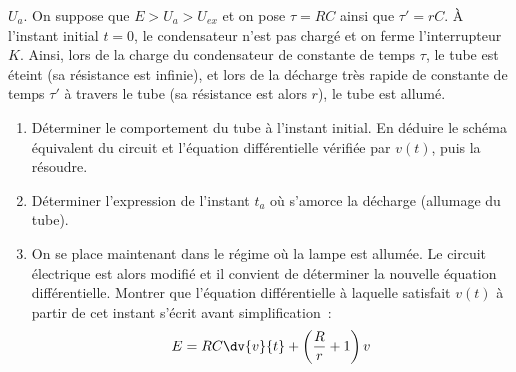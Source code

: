 \documentclass[a4paper, 10pt, garamond, oneside]{book}
\begin{document}
{	$U_{a}$.
	\bigbreak
	On suppose que $E > U_{a}  > U_{ex}$ et on pose $\tau = RC$ ainsi que
	$\tau' = rC$.
	\smallbreak
	À l'instant initial $t = 0$, le condensateur n'est pas chargé et on ferme
	l'interrupteur $K$.
	\bigbreak
	Ainsi, lors de la charge du condensateur de constante de temps $\tau$, le tube
	est éteint (sa résistance est infinie), et lors de la décharge très rapide de
	constante de temps $\tau'$ à travers le tube (sa résistance est alors $r$), le
	tube est allumé.
	\begin{enumerate}
		\item
		      Déterminer le comportement du tube à l'instant initial.
		      En déduire le schéma équivalent du circuit et l'équation différentielle vérifiée par $v(t)$, puis la résoudre.
		\item
		      Déterminer l'expression de l'instant $t_{a}$  où s'amorce la décharge (allumage du tube).
		\item
		      On se place maintenant dans le régime où la lampe est allumée. Le circuit électrique est alors modifié et il convient de déterminer la nouvelle équation différentielle. Montrer que l'équation différentielle à laquelle satisfait $v(t)$ à partir de cet instant s'écrit avant simplification~:
		      \[
			      E = RC \dv{v}{t} + \left(\frac{R}{r}+1\right) v
		      \]


\end{enumerate}}
\end{document}
